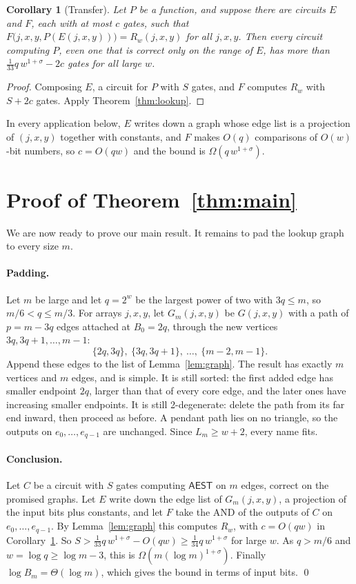 \documentclass[11pt]{article}
\newtheorem{corollary}[theorem]{Corollary}
\theoremstyle{definition}
\theoremstyle{remark}
\newcommand{\AEST}{\mathsf{AEST}}
\begin{document}
\begin{corollary}[Transfer]\label{cor:transfer}
Let $P$ be a function, and suppose there are circuits $E$ and $F$, each
with at most $c$ gates, such that
$F\bigl(j,x,y,P(E(j,x,y))\bigr)=R_w(j,x,y)$ for all $j,x,y$. Then every
circuit computing $P$, even one that is correct only on the range of $E$,
has more than $\tfrac1{33}q\,w^{1+\sigma}-2c$ gates for all large $w$.
\end{corollary}
\begin{proof}
Composing $E$, a circuit for $P$ with $S$ gates, and $F$ computes $R_w$
with $S+2c$ gates. Apply Theorem~\ref{thm:lookup}.
\end{proof}

In every application below, $E$ writes down a graph whose edge list is a
projection of $(j,x,y)$ together with constants, and $F$ makes $O(q)$
comparisons of $O(w)$-bit numbers, so $c=O(qw)$ and the bound is
$\Omega(q\,w^{1+\sigma})$.

\section{Proof of Theorem~\ref{thm:main}}\label{sec:proof}

We are now ready to prove our main result. It remains to pad the lookup
graph to every size $m$.

\paragraph{Padding.} Let $m$ be large and let $q=2^w$ be the largest power
of two with $3q\le m$, so $m/6<q\le m/3$. For arrays $j,x,y$, let
$G_m(j,x,y)$ be $G(j,x,y)$ with a path of $p=m-3q$ edges attached at
$B_0=2q$, through the new vertices $3q,3q+1,\dots,m-1$:
\[
\{2q,3q\},\ \{3q,3q+1\},\ \dots,\ \{m-2,m-1\}.
\]
Append these edges to the list of Lemma~\ref{lem:graph}. The result has
exactly $m$ vertices and $m$ edges, and is simple. It is still sorted: the
first added edge has smaller endpoint $2q$, larger than that of every core
edge, and the later ones have increasing smaller endpoints. It is still
2-degenerate: delete the path from its far end inward, then proceed as
before. A pendant path lies on no triangle, so the outputs on
$e_0,\dots,e_{q-1}$ are unchanged. Since $L_m\ge w+2$, every name fits.

\paragraph{Conclusion.} Let $C$ be a circuit with $S$ gates computing
$\AEST$ on $m$ edges, correct on the promised graphs. Let $E$ write down
the edge list of $G_m(j,x,y)$, a projection of the input bits plus
constants, and let $F$ take the AND of the outputs of $C$ on
$e_0,\dots,e_{q-1}$. By Lemma~\ref{lem:graph} this computes $R_w$, with
$c=O(qw)$ in Corollary~\ref{cor:transfer}. So
$S>\tfrac1{33}q\,w^{1+\sigma}-O(qw)\ge\tfrac1{34}q\,w^{1+\sigma}$ for
large $w$. As $q>m/6$ and $w=\log q\ge\log m-3$, this is
$\Omega(m(\log m)^{1+\sigma})$. Finally $\log B_m=\Theta(\log m)$, which
gives the bound in terms of input bits. \qed
\end{document}
